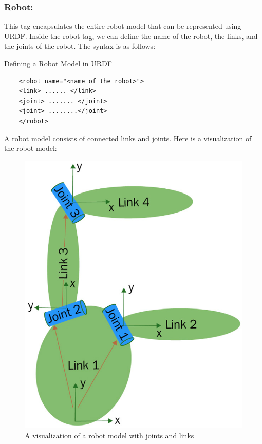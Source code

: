 \documentclass[../../main]{subfiles}
\begin{document}
\subsubsection{Robot:}
This tag encapsulates the entire robot model that can be represented using
URDF. Inside the robot tag, we can define the name of the robot, the links, and the
joints of the robot.
The syntax is as follows:

\begin{codebox}[]{Defining a Robot Model in URDF}
  \begin{verbatim}
    <robot name="<name of the robot>">
    <link> ...... </link>
    <joint> ....... </joint>
    <joint> ........</joint>
    </robot>
\end{verbatim}
  \end{codebox}
A robot model consists of connected links and joints. Here is a visualization of the
robot model:
\begin{figure}[ht]
    \centering
    \includegraphics{sublatex/hashem/img/robot1.jpg}
    \caption{A visualization of a robot model with joints and links\cite{joseph2018mastering}}
\end{figure}
\end{document}
